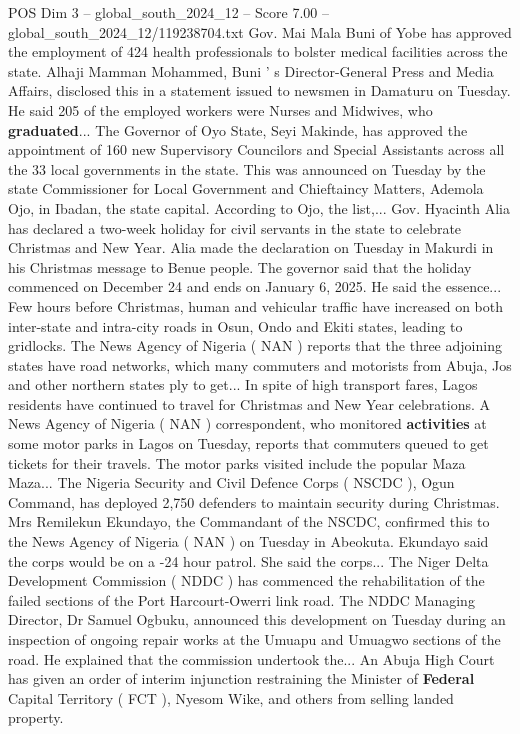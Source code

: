 \begin{textsample}{POS Dim 3 – global\_south\_2024\_12 – Score 7.00 – global\_south\_2024\_12/119238704.txt}
Gov.
Mai Mala Buni of Yobe has approved the employment of 424 health professionals to bolster medical facilities across the state.
Alhaji Mamman Mohammed, Buni ' s Director-General Press and Media Affairs, disclosed this in a statement issued to newsmen in Damaturu on Tuesday.
He said 205 of the employed workers were Nurses and Midwives, who \textbf{graduated}...
The Governor of Oyo State, Seyi Makinde, has approved the appointment of 160 new Supervisory Councilors and Special Assistants across all the 33 local governments in the state.
This was announced on Tuesday by the state Commissioner for Local Government and Chieftaincy Matters, Ademola Ojo, in Ibadan, the state capital.
According to Ojo, the list,...
Gov.
Hyacinth Alia has declared a two-week holiday for civil servants in the state to celebrate Christmas and New Year.
Alia made the declaration on Tuesday in Makurdi in his Christmas message to Benue people.
The governor said that the holiday commenced on December 24 and ends on January 6, 2025.
He said the essence...
Few hours before Christmas, human and vehicular traffic have increased on both inter-state and intra-city roads in Osun, Ondo and Ekiti states, leading to gridlocks.
The News Agency of Nigeria ( NAN ) reports that the three adjoining states have road networks, which many commuters and motorists from Abuja, Jos and other northern states ply to get...
In spite of high transport fares, Lagos residents have continued to travel for Christmas and New Year celebrations.
A News Agency of Nigeria ( NAN ) correspondent, who monitored \textbf{activities} at some motor parks in Lagos on Tuesday, reports that commuters queued to get tickets for their travels.
The motor parks visited include the popular Maza Maza...
The Nigeria Security and Civil Defence Corps ( NSCDC ), Ogun Command, has deployed 2,750 defenders to maintain security during Christmas.
Mrs Remilekun Ekundayo, the Commandant of the NSCDC, confirmed this to the News Agency of Nigeria ( NAN ) on Tuesday in Abeokuta.
Ekundayo said the corps would be on a -24 hour patrol.
She said the corps...
The Niger Delta Development Commission ( NDDC ) has commenced the rehabilitation of the failed sections of the Port Harcourt-Owerri link road.
The NDDC Managing Director, Dr Samuel Ogbuku, announced this development on Tuesday during an inspection of ongoing repair works at the Umuapu and Umuagwo sections of the road.
He explained that the commission undertook the...
An Abuja High Court has given an order of interim injunction restraining the Minister of \textbf{Federal} Capital Territory ( FCT ), Nyesom Wike, and others from selling landed property.

\end{textsample}
